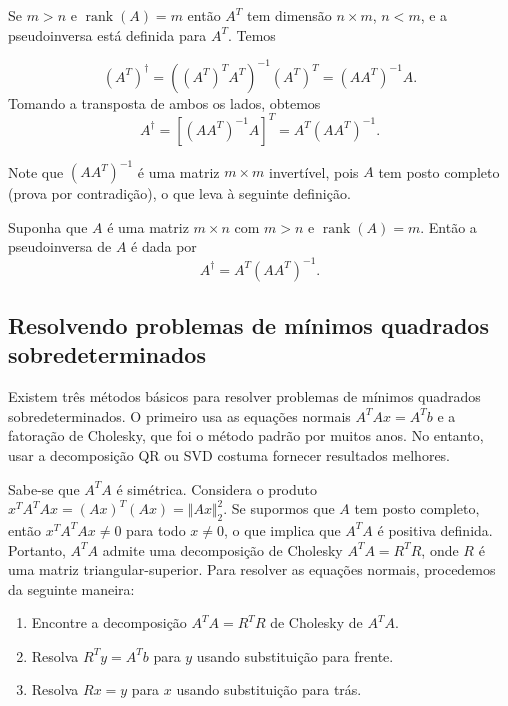\documentclass{article}
\DeclareMathOperator{\rank}{rank}
\begin{document}
Se \(m > n\) e \(\rank(A) = m\) então \(A^T\) tem dimensão \(n \times m\), \(n < m\), e a pseudoinversa está definida para \(A^T\). Temos

\[
    (A^T)^{\dagger} = ((A^T)^TA^T)^{-1}(A^T)^T = (AA^T)^{-1}A.
\] Tomando a transposta de ambos os lados, obtemos
\[
    A^{\dagger} = [(AA^T)^{-1}A]^T = A^T(AA^T)^{-1}.
\]

Note que \((AA^T)^{-1}\) é uma matriz \(m \times m\) invertível, pois \(A\) tem posto completo (prova por contradição), o que leva à seguinte definição.

\begin{defn}
    Suponha que \(A\) é uma matriz \(m \times n\) com \(m > n\) e \(\rank(A) = m\). Então a pseudoinversa de \(A\) é dada por
    \begin{equation}
        A^{\dagger} = A^T(AA^T)^{-1}.
    \end{equation}
\end{defn}

\subsection{Resolvendo problemas de mínimos quadrados sobredeterminados}

Existem três métodos básicos para resolver problemas de mínimos quadrados sobredeterminados. O primeiro usa as equações normais \(A^TAx = A^Tb\) e a fatoração de Cholesky, que foi o método padrão por muitos anos. No entanto, usar a decomposição QR ou SVD costuma fornecer resultados melhores.

Sabe-se que \(A^TA\) é simétrica. Considera o produto \(x^TA^TAx = (Ax)^T(Ax) = \Vert Ax \Vert_2^2\). Se supormos que \(A\) tem posto completo, então \(x^TA^TAx \neq 0\) para todo \(x \neq 0\), o que implica que \(A^TA\) é positiva definida. Portanto, \(A^TA\) admite uma decomposição de Cholesky \(A^TA = R^TR\), onde \(R\) é uma matriz triangular-superior. Para resolver as equações normais, procedemos da seguinte maneira:

\begin{tcolorbox}[title=Resolvendo as equações normais com a fatoração de Cholesky]
    \begin{enumerate}
        \item [a.] Encontre a decomposição \(A^TA = R^TR\) de Cholesky de \(A^TA\).
        \item [b.] Resolva \(R^Ty = A^Tb\) para \(y\) usando substituição para frente.
        \item [c.] Resolva \(Rx = y\) para \(x\) usando substituição para trás.
    \end{enumerate}
\end{tcolorbox}
\end{document}
